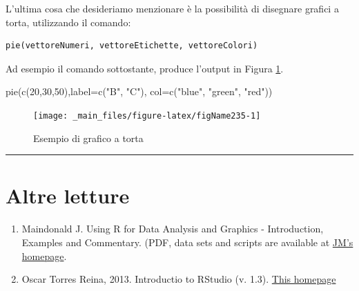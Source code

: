 \documentclass[a4paper,12pt,oneside]{book}
\providecommand{\tightlist}{%
  \setlength{\itemsep}{0pt}\setlength{\parskip}{0pt}}
\newenvironment{Shaded}{\begin{snugshade}}{\end{snugshade}}
\newcommand{\DecValTok}[1]{#1}
\newcommand{\StringTok}[1]{#1}
\newcommand{\FunctionTok}[1]{#1}
\newcommand{\AttributeTok}[1]{#1}
\newcommand{\NormalTok}[1]{#1}
\begin{document}
L'ultima cosa che desideriamo menzionare è la possibilità di disegnare grafici a torta, utilizzando il comando:

\begin{verbatim}
pie(vettoreNumeri, vettoreEtichette, vettoreColori)
\end{verbatim}

Ad esempio il comando sottostante, produce l'output in Figura \ref{fig:figName235}.

\begin{Shaded}
\begin{Highlighting}[]
\FunctionTok{pie}\NormalTok{(}\FunctionTok{c}\NormalTok{(}\DecValTok{20}\NormalTok{,}\DecValTok{30}\NormalTok{,}\DecValTok{50}\NormalTok{),}\AttributeTok{label=}\FunctionTok{c}\NormalTok{(}\StringTok{"B"}\NormalTok{, }\StringTok{"C"}\NormalTok{),}
        \AttributeTok{col=}\FunctionTok{c}\NormalTok{(}\StringTok{"blue"}\NormalTok{, }\StringTok{"green"}\NormalTok{, }\StringTok{"red"}\NormalTok{))}
\end{Highlighting}
\end{Shaded}

\begin{figure}

{\centering \texttt{[image: \_main\_files/figure-latex/figName235-1]} 

}

\caption{Esempio di grafico a torta}\label{fig:figName235}
\end{figure}

\begin{center}\rule{0.5\linewidth}{0.5pt}\end{center}

\hypertarget{altre-letture-12}{%
\section*{Altre letture}\label{altre-letture-12}}

\begin{enumerate}
\def\labelenumi{\arabic{enumi}.}
\tightlist
\item
  Maindonald J. Using R for Data Analysis and Graphics - Introduction, Examples and Commentary. (PDF, data sets and scripts are available at \href{https://cran.r-project.org/doc/contrib/usingR.pdff}{JM's homepage}.
\item
  Oscar Torres Reina, 2013. Introductio to RStudio (v. 1.3). \href{https://dss.princeton.edu/training/RStudio101.pdf}{This homepage}
\end{enumerate}
\end{document}

